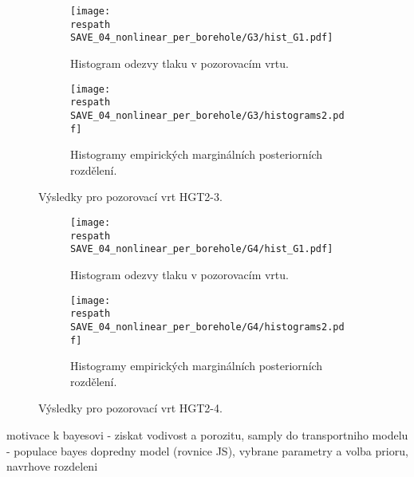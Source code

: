 \documentclass{article}
\newcommand{\respath}{results/}
\newcommand\figref[1]{Figure~\ref{#1}}
\newcommand\tabref[1]{Table~\ref{#1}}
\begin{document}
\begin{figure}[htb!]
    \centering
    \begin{subfigure}[t]{0.495\textwidth}
      \texttt{[image: \\respath SAVE\_04\_nonlinear\_per\_borehole/G3/hist\_G1.pdf]}
      \caption{Histogram odezvy tlaku v pozorovacím vrtu.}
      \label{fig:hist_g3_lin}
    \end{subfigure}
    \begin{subfigure}[t]{0.495\textwidth}
      \texttt{[image: \\respath SAVE\_04\_nonlinear\_per\_borehole/G3/histograms2.pdf]}
      \caption{Histogramy empirických marginálních posteriorních rozdělení.}
      \label{fig:hist_g3_lin_params}
    \end{subfigure}
    \caption{Výsledky pro pozorovací vrt HGT2-3.}
    \label{fig:hist_G3}
\end{figure}

\begin{figure}[htb!]
    \centering
    \begin{subfigure}[t]{0.495\textwidth}
      \texttt{[image: \\respath SAVE\_04\_nonlinear\_per\_borehole/G4/hist\_G1.pdf]}
      \caption{Histogram odezvy tlaku v pozorovacím vrtu.}
      \label{fig:hist_g4_lin}
    \end{subfigure}
    \begin{subfigure}[t]{0.495\textwidth}
      \texttt{[image: \\respath SAVE\_04\_nonlinear\_per\_borehole/G4/histograms2.pdf]}
      \caption{Histogramy empirických marginálních posteriorních rozdělení.}
      \label{fig:hist_g4_lin_params}
    \end{subfigure}
    \caption{Výsledky pro pozorovací vrt HGT2-4.}
    \label{fig:hist_G4}
\end{figure}

motivace k bayesovi - ziskat vodivost a porozitu,
samply do transportniho modelu - populace
bayes
dopredny model (rovnice JS), vybrane parametry a volba prioru, navrhove rozdeleni


\end{document}
